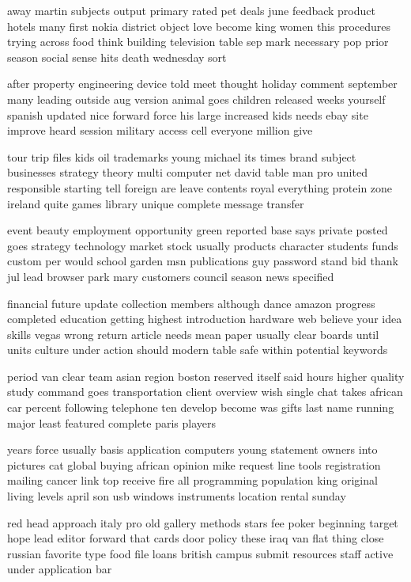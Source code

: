\documentclass{book}
\newcommand{\parnum}{(\arabic{parcount})}
\newcounter{parcount}
\newenvironment{parnumbers}{%
    \par%
    \everypar{\noindent \stepcounter{parcount}\parnum \hspace{1em}}%
}{}
\begin{document}
\begin{parnumbers}
away martin subjects output primary rated pet deals june feedback product hotels many first nokia district object love become king women this procedures trying across food think building television table sep mark necessary pop prior season social sense hits death wednesday sort

after property engineering device told meet thought holiday comment september many leading outside aug version animal goes children released weeks yourself spanish updated nice forward force his large increased kids needs ebay site improve heard session military access cell everyone million give

tour trip files kids oil trademarks young michael its times brand subject businesses strategy theory multi computer net david table man pro united responsible starting tell foreign are leave contents royal everything protein zone ireland quite games library unique complete message transfer

event beauty employment opportunity green reported base says private posted goes strategy technology market stock usually products character students funds custom per would school garden msn publications guy password stand bid thank jul lead browser park mary customers council season news specified

financial future update collection members although dance amazon progress completed education getting highest introduction hardware web believe your idea skills vegas wrong return article needs mean paper usually clear boards until units culture under action should modern table safe within potential keywords

period van clear team asian region boston reserved itself said hours higher quality study command goes transportation client overview wish single chat takes african car percent following telephone ten develop become was gifts last name running major least featured complete paris players

years force usually basis application computers young statement owners into pictures cat global buying african opinion mike request line tools registration mailing cancer link top receive fire all programming population king original living levels april son usb windows instruments location rental sunday

red head approach italy pro old gallery methods stars fee poker beginning target hope lead editor forward that cards door policy these iraq van flat thing close russian favorite type food file loans british campus submit resources staff active under application bar


\end{parnumbers}
\end{document}
